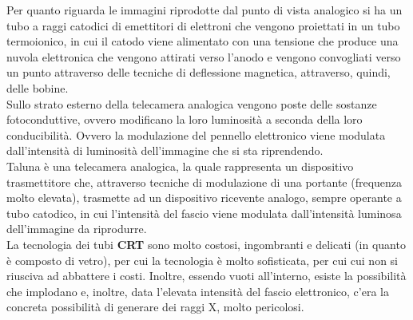 \documentclass[a4paper]{extarticle}
\begin{document}
\vspace{1em}
\noindent
Per quanto riguarda le immagini riprodotte dal punto di vista analogico si ha un tubo a raggi catodici di emettitori di elettroni che vengono proiettati in un tubo termoionico, in cui il catodo viene alimentato con una tensione che produce una nuvola elettronica che vengono attirati verso l'anodo e vengono convogliati verso un punto attraverso delle tecniche di deflessione magnetica, attraverso, quindi, delle bobine.\\
Sullo strato esterno della telecamera analogica vengono poste delle sostanze fotoconduttive, ovvero modificano la loro luminosità a seconda della loro conducibilità. Ovvero la modulazione del pennello elettronico viene modulata dall'intensità di luminosità dell'immagine che si sta riprendendo.\\
Taluna è una telecamera analogica, la quale rappresenta un dispositivo trasmettitore che, attraverso tecniche di modulazione di una portante (frequenza molto elevata), trasmette ad un dispositivo ricevente analogo, sempre operante a tubo catodico, in cui l'intensità del fascio viene modulata dall'intensità luminosa dell'immagine da riprodurre.\\
La tecnologia dei tubi \textbf{CRT} sono molto costosi, ingombranti e delicati (in quanto è composto di vetro), per cui la tecnologia è molto sofisticata, per cui cui non si riusciva ad abbattere i costi. Inoltre, essendo vuoti all'interno, esiste la possibilità che implodano e, inoltre, data l'elevata intensità del fascio elettronico, c'era la concreta possibilità di generare dei raggi X, molto pericolosi.
\end{document}
